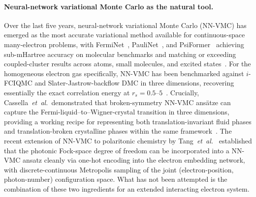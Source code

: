 \paragraph*{Neural-network variational Monte Carlo as the natural tool.}
Over the last five years, neural-network variational Monte Carlo
(NN-VMC) has emerged as the most accurate variational method available
for continuous-space many-electron problems, with
FermiNet~\cite{Pfau2020}, PauliNet~\cite{Hermann2020}, and
PsiFormer~\cite{vonGlehn2023} achieving sub-mHartree accuracy on
molecular benchmarks and matching or exceeding coupled-cluster results
across atoms, small molecules, and excited
states~\cite{Pfau2024}. For the homogeneous electron gas
specifically, NN-VMC has been benchmarked against $i$-FCIQMC and
Slater-Jastrow-backflow DMC in three dimensions, recovering essentially
the exact correlation energy at $r_s = 0.5$--$5$~\cite{Cassella2023,
Wilson2023,Pescia2024}. Crucially, Cassella~\textit{et~al.}\
demonstrated that broken-symmetry NN-VMC ans\"atze can capture the
Fermi-liquid–to–Wigner-crystal transition in three dimensions, providing
a working recipe for representing both translation-invariant fluid
phases and translation-broken crystalline phases within the same
framework~\cite{Cassella2023}. The recent extension of NN-VMC to
polaritonic chemistry by Tang~\textit{et~al.}~\cite{Tang2025}
established that the photonic Fock-space degree of freedom can be
incorporated into a NN-VMC ansatz cleanly via one-hot encoding into the
electron embedding network, with discrete-continuous Metropolis sampling
of the joint (electron-position, photon-number) configuration space.
What has not been attempted is the combination of these two ingredients
for an extended interacting electron system.

